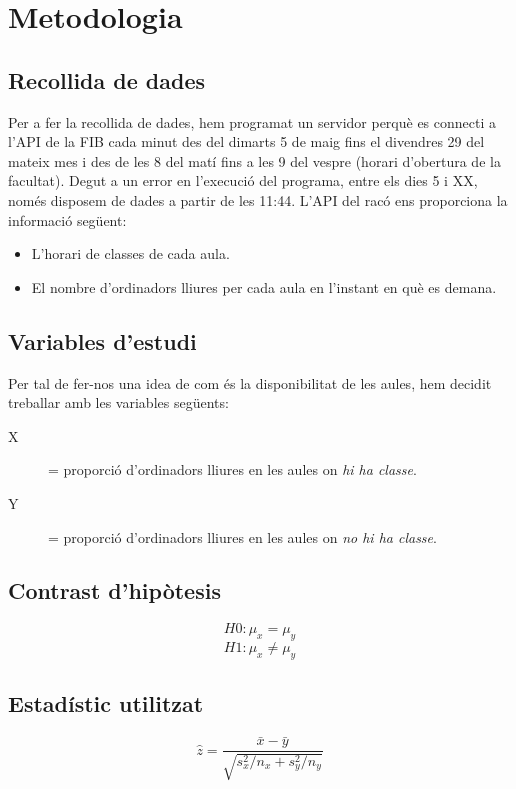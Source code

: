 \section{Metodologia}

\subsection{Recollida de dades}
Per a fer la recollida de dades, hem programat un servidor perquè es connecti a l'API de la FIB cada minut des del dimarts 5 de maig fins el divendres 29 del mateix mes i des de les 8 del matí fins a les 9 del vespre (horari d'obertura de la facultat). Degut a un error en l'execució del programa, entre els dies 5 i XX, només disposem de dades a partir de les  11:44.
L'API del racó ens proporciona la informació següent:
\begin{itemize}
	\item L'horari de classes de cada aula.
	\item El nombre d'ordinadors lliures per cada aula en l'instant en què es demana.
\end{itemize}

\subsection{Variables d'estudi}
Per tal de fer-nos una idea de com és la disponibilitat de les aules, hem decidit treballar amb les variables següents:
\begin{description}
	\item[X] = proporció d'ordinadors lliures en les aules on \emph{hi ha classe}.
	\item[Y] = proporció d'ordinadors lliures en les aules on \emph{no hi ha classe}.
\end{description}

 
\subsection{Contrast d'hipòtesis}
$$H0: \mu_x = \mu_y$$
$$H1: \mu_x \neq \mu_y$$

\subsection{Estadístic utilitzat}
$$\hat{z} = \frac{\bar{x} - \bar{y}}{\sqrt{s_x^2/n_x + s_y^2/n_y}} $$



